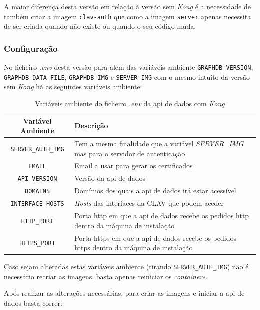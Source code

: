 A maior diferença desta versão em relação à versão sem \textit{Kong} é a necessidade de também criar a imagem \texttt{clav-auth} que como a imagem \texttt{server} apenas necessita de ser criada quando não existe ou quando o seu código muda.

\subsubsection{Configuração}

No ficheiro \textit{.env} desta versão para além das variáveis ambiente \texttt{GRAPHDB\_VERSION}, \texttt{GRAPHDB\_DATA\_FILE}, \texttt{GRAPHDB\_IMG} e \texttt{SERVER\_IMG} com o mesmo intuito da versão sem \textit{Kong} há as seguintes variáveis ambiente:

\begin{table}[H]
\fontsize{10}{12}\selectfont
\begin{tabularx}{\textwidth}{|c|X|}
    \hline
    Variável Ambiente & Descrição \\ \hline
    \texttt{SERVER\_AUTH\_IMG} & Tem a mesma finalidade que a variável \textit{SERVER\_IMG} mas para o servidor de autenticação \\ \hline
    \texttt{EMAIL} & Email a usar para gerar os certificados \\ \hline
    \texttt{API\_VERSION} & Versão da \acrshort{api} de dados \\ \hline
    \texttt{DOMAINS} & Domínios dos quais a \acrshort{api} de dados irá estar acessível \\ \hline
    \texttt{INTERFACE\_HOSTS} & \textit{Hosts} das interfaces da CLAV que podem aceder \\ \hline
    \texttt{HTTP\_PORT} & Porta \acrshort{http} em que a \acrshort{api} de dados recebe os pedidos \acrshort{http} dentro da máquina de instalação \\ \hline
    \texttt{HTTPS\_PORT} & Porta \acrshort{https} em que a \acrshort{api} de dados recebe os pedidos \acrshort{https} dentro da máquina de instalação \\ \hline
\end{tabularx}
\caption{Variáveis ambiente do ficheiro \textit{.env} da \acrshort{api} de dados com \textit{Kong}}
\end{table}

Caso sejam alteradas estas variáveis ambiente (tirando \texttt{SERVER\_AUTH\_IMG}) não é necessário recriar as imagens, basta apenas reiniciar os \textit{containers}.

Após realizar as alterações necessárias, para criar as imagens e iniciar a \acrshort{api} de dados basta correr:

